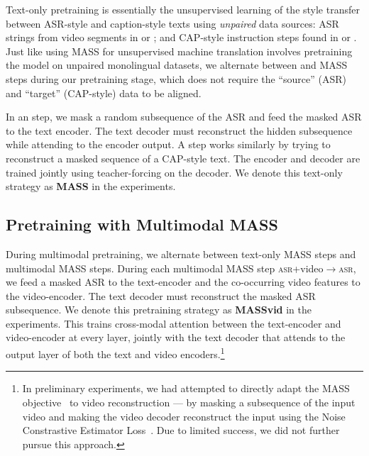 \documentclass[11pt,a4paper]{article}
\begin{document}
\iffalse
\begin{figure*}
    \centering
    \texttt{[image: plots/mass\_archi\_big.pdf]}
    \caption{MASS Pretraining. 
    We mask a random subsequence of text (masked tokens represented with ``\_'') and feed it to the encoder. The decoder has to to reconstruct the masked input, but it can only access the visible parts of the input after learning encoder-decoder attention. Figure courtesy of~\citet{song2019mass}.}
    \label{fig:textmass}
\end{figure*}
\fi

Text-only pretraining is essentially the unsupervised learning of the style transfer between ASR-style and caption-style texts using {\em unpaired} data sources: ASR strings from video segments in \youtube or \howto; and CAP-style instruction steps
found in \recipes or \howto.
Just like using MASS for unsupervised machine translation involves pretraining the model on unpaired monolingual datasets,
we alternate between \ASRtoASR and \CAPtoCAP MASS steps during our pretraining stage,
which does not require the ``source'' (ASR) and ``target'' (CAP-style) data to be aligned.


In an \ASRtoASR step, we mask a random subsequence of the ASR and feed the masked ASR to the text encoder. The text decoder must reconstruct the hidden subsequence while attending to the encoder output. A \CAPtoCAP step works similarly by trying to reconstruct a masked sequence of a CAP-style text.  The encoder and decoder are trained jointly using teacher-forcing on the decoder. We denote this text-only strategy as \textbf{MASS} in the experiments.


\subsection{Pretraining with Multimodal MASS}

During multimodal pretraining, 
we alternate between text-only \CAPtoCAP MASS steps and multimodal MASS steps.
During each multimodal MASS step \textsc{asr}+video$\to$\textsc{asr}, we feed a masked ASR to the text-encoder and the co-occurring video features to the video-encoder.
The text decoder must reconstruct the masked ASR subsequence.
We denote this pretraining strategy as \textbf{MASSvid} in the experiments.
This trains cross-modal attention between the text-encoder and video-encoder at every layer, 
jointly with the text decoder that attends to the output layer of both the text and video encoders.\footnote{
In preliminary experiments, we had attempted to directly adapt the MASS objective~\citep{song2019mass} to video reconstruction --- by masking a subsequence of the input video and making the video decoder reconstruct the input using the Noise Constrastive Estimator Loss~\citep{sun2019contrastive}. 
Due to limited success, we did not further pursue this approach.
}
\end{document}

